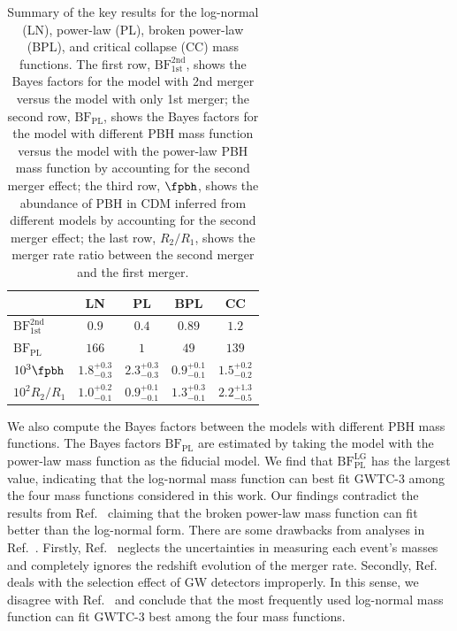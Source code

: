 \documentclass[
reprint,           %
superscriptaddress,%
amsmath,           %
amssymb,           %
aps,               %
prd,               %
notitlepage,       %
longbibliography,  %
floatfix,          %
nofootinbib,
]{revtex4-1}
\begin{document}
\begin{table}[tbp!]
	\centering
	\begin{tabular}{l|c|c|c|c}
		\hline\hline
		& LN & PL & BPL & CC \\
		\hline
		$\mathrm{BF}^{\mathrm{2nd}}_{\mathrm{1st}}$ & $0.9$ & $0.4$ & $0.89$ & $1.2$ \\
		$\mathrm{BF}_{\mathrm{PL}}$ & $166$ & $1$ & $49$ & $139$ \\
		$10^{3}\fpbh$ & $1.8^{+0.3}_{-0.3}$ & $2.3^{+0.3}_{-0.3}$ & $0.9^{+0.1}_{-0.1}$ & $1.5^{+0.2}_{-0.2}$ \\
		$10^{2}R_2/R_1$ & $1.0^{+0.2}_{-0.1}$ & $0.9^{+0.1}_{-0.1}$ & $1.3^{+0.3}_{-0.1}$ & $2.2^{+1.3}_{-0.5}$ \\
		\hline
	\end{tabular}
	\caption{\label{table:BF}Summary of the key results for the log-normal (LN), power-law (PL), broken power-law (BPL), and critical collapse (CC) mass functions. The first row, $\mathrm{BF}^{\mathrm{2nd}}_{\mathrm{1st}}$, shows the Bayes factors for the model with 2nd merger versus the model with only 1st merger; the second row, $\mathrm{BF}_{\mathrm{PL}}$, shows the Bayes factors for the model with different PBH mass function versus the model with the power-law PBH mass function by accounting for the second merger effect; the third row, $\fpbh$, shows the abundance of PBH in CDM inferred from different models by accounting for the second merger effect; the last row, $R_2/R_1$, shows the merger rate ratio between the second merger and the first merger.}
\end{table}

We also compute the Bayes factors between the models with different PBH mass functions. The Bayes factors $\mathrm{BF}_{\mathrm{PL}}$ are estimated by taking the model with the power-law mass function as the fiducial model. 
We find that $\mathrm{BF}_{\mathrm{PL}}^{\mathrm{LG}}$ has the largest value, indicating that the log-normal mass function can best fit GWTC-3 among the four mass functions considered in this work. Our findings contradict the results from Ref.~\cite{Deng:2021ezy} claiming that the broken power-law mass function can fit better than the log-normal form. There are some drawbacks from analyses in Ref.~\cite{Deng:2021ezy}. Firstly, Ref.~\cite{Deng:2021ezy} neglects the uncertainties in measuring each event's masses and completely ignores the redshift evolution of the merger rate. Secondly, Ref.~\cite{Deng:2021ezy} deals with the selection effect of GW detectors improperly. In this sense, we disagree with Ref.~\cite{Deng:2021ezy} and conclude that the most frequently used log-normal mass function can fit GWTC-3 best among the four mass functions.
\end{document}
